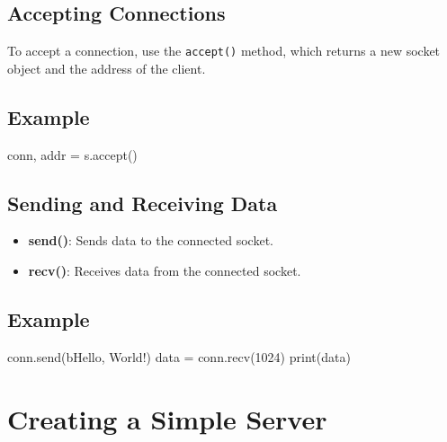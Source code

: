 \documentclass[
  letterpaper,
  DIV=11,
  numbers=noendperiod]{scrreprt}
\newenvironment{Shaded}{\begin{snugshade}}{\end{snugshade}}
\newcommand{\BuiltInTok}[1]{\textcolor[rgb]{0.00,0.23,0.31}{#1}}
\newcommand{\DecValTok}[1]{\textcolor[rgb]{0.68,0.00,0.00}{#1}}
\newcommand{\NormalTok}[1]{\textcolor[rgb]{0.00,0.23,0.31}{#1}}
\newcommand{\OperatorTok}[1]{\textcolor[rgb]{0.37,0.37,0.37}{#1}}
\newcommand{\StringTok}[1]{\textcolor[rgb]{0.13,0.47,0.30}{#1}}
\providecommand{\tightlist}{%
  \setlength{\itemsep}{0pt}\setlength{\parskip}{0pt}}\usepackage{longtable,booktabs,array}
\begin{document}
\subsection{Accepting Connections}\label{accepting-connections}

To accept a connection, use the \texttt{accept()} method, which returns
a new socket object and the address of the client.

\subsection{Example}\label{example-13}

\begin{Shaded}
\begin{Highlighting}[]
\NormalTok{conn, addr }\OperatorTok{=}\NormalTok{ s.accept()}
\end{Highlighting}
\end{Shaded}

\subsection{Sending and Receiving
Data}\label{sending-and-receiving-data}

\begin{itemize}
\tightlist
\item
  \textbf{send()}: Sends data to the connected socket.
\item
  \textbf{recv()}: Receives data from the connected socket.
\end{itemize}

\subsection{Example}\label{example-14}

\begin{Shaded}
\begin{Highlighting}[]
\NormalTok{conn.send(}\StringTok{b\textquotesingle{}Hello, World!\textquotesingle{}}\NormalTok{)}
\NormalTok{data }\OperatorTok{=}\NormalTok{ conn.recv(}\DecValTok{1024}\NormalTok{)}
\BuiltInTok{print}\NormalTok{(data)}
\end{Highlighting}
\end{Shaded}

\section{Creating a Simple Server}\label{creating-a-simple-server}
\end{document}
